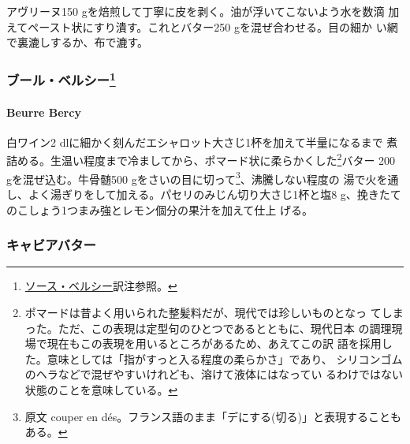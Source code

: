 \begin{recette}
アヴリーヌ150 gを焙煎して丁寧に皮を剥く。油が浮いてこないよう水を数滴
加えてペースト状にすり潰す。これとバター250 gを混ぜ合わせる。目の細か
い網で裏漉しするか、布で漉す。

\maeaki

\hypertarget{ux30d6ux30fcux30ebux30d9ux30ebux30b7ux30fc9}{%
\subsubsection[ブール・ベルシー]{\texorpdfstring{ブール・ベルシー\footnote{\protect\hyperlink{sauce-bercy}{ソース・ベルシー}訳注参照。}}{ブール・ベルシー}}\label{ux30d6ux30fcux30ebux30d9ux30ebux30b7ux30fc9}}

\hypertarget{beurre-bercy}{%
\paragraph{Beurre Bercy}\label{beurre-bercy}}


白ワイン2 dlに細かく刻んだエシャロット大さじ1杯を加えて半量になるまで
煮詰める。生温い程度まで冷ましてから、ポマード状に柔らかくした\footnote{ポマードは昔よく用いられた整髪料だが、現代では珍しいものとなっ
  てしまった。ただ、この表現は定型句のひとつであるとともに、現代日本
  の調理現場で現在もこの表現を用いるところがあるため、あえてこの訳
  語を採用した。意味としては「指がすっと入る程度の柔らかさ」であり、
  シリコンゴムのヘラなどで混ぜやすいけれども、溶けて液体にはなってい
  るわけではない状態のことを意味している。}バター 200
gを混ぜ込む。牛骨髄500 gをさいの目に切って\footnote{原文 couper en
  dés。フランス語のまま「デにする(切る)」と表現することもある。}、沸騰しない程度の
湯で火を通し、よく湯ぎりをして加える。パセリのみじん切り大さじ1杯と塩8
g、挽きたてのこしょう1つまみ強とレモン\undemi{}個分の果汁を加えて仕上
げる。

\maeaki

\hypertarget{ux30adux30e3ux30d3ux30a2ux30d0ux30bfux30fc}{%
\subsubsection{キャビアバター}\label{ux30adux30e3ux30d3ux30a2ux30d0ux30bfux30fc}}


\end{recette}

